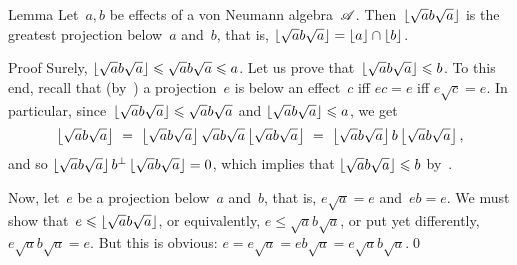 \documentclass[a]{subfiles}
\begin{document}
\begin{parsec}%
\begin{point}{Lemma}%
Let~$a,b$ be effects of a von Neumann algebra~$\mathscr{A}$.
Then~$\left\lfloor\sqrt{a}b\sqrt{a}\right\rfloor$ is the greatest projection
below~$a$ and~$b$, that is, 
$\left\lfloor\sqrt{a}b\sqrt{a}\right\rfloor=\left\lfloor a\right\rfloor\cap \left\lfloor b\right\rfloor$.
\begin{point}{Proof}%
Surely, $\left\lfloor\sqrt{a}b\sqrt{a}\right\rfloor\leqslant \sqrt{a}b\sqrt{a} \leqslant a$.
Let us prove that~$\left\lfloor\sqrt{a}b\sqrt{a}\right\rfloor\leqslant b$.
To this end,
recall
that (by~)
a projection~$e$ is below an effect~$c$
iff $ec=e$ iff $e\sqrt{c}=e$.
In particular,
since~$\left\lfloor\sqrt{a}b\sqrt{a}\right\rfloor\leqslant \sqrt{a}b\sqrt{a}$ and 
$\left\lfloor\sqrt{a}b\sqrt{a}\right\rfloor\leqslant a$,
we get
\begin{equation*}
\floor{\sqrt{a}b\sqrt{a}}
\ =\ \floor{\sqrt{a}b\sqrt{a}}\sqrt{a}b\sqrt{a}\floor{\sqrt{a}b\sqrt{a}} \ =\ 
\floor{\sqrt{a}b\sqrt{a}}b\floor{\sqrt{a}b\sqrt{a}},
\end{equation*}
and so $\left\lfloor\sqrt{a}b\sqrt{a}\right\rfloor b^\perp\left\lfloor\sqrt{a}b\sqrt{a}\right\rfloor=0$,
which implies that
$\left\lfloor\sqrt{a}b\sqrt{a}\right\rfloor\leqslant b$ by~.
\begin{point}%
Now,
let~$e$ be a projection below~$a$ and~$b$,
that is, $e\sqrt{a}=e$ and~$eb=e$.
We must show that~$e\leqslant \left\lfloor\sqrt{a}b\sqrt{a}\right\rfloor$,
or equivalently, $e\leq \sqrt{a}b\sqrt{a}$,
or put yet differently, $e\sqrt{a}b\sqrt{a}=e$.
But this is obvious: $e=e\sqrt{a}=eb\sqrt{a}=e\sqrt{a}b\sqrt{a}$.\qed
\end{point}
\end{point}
\end{point}
\end{parsec}
\end{document}

